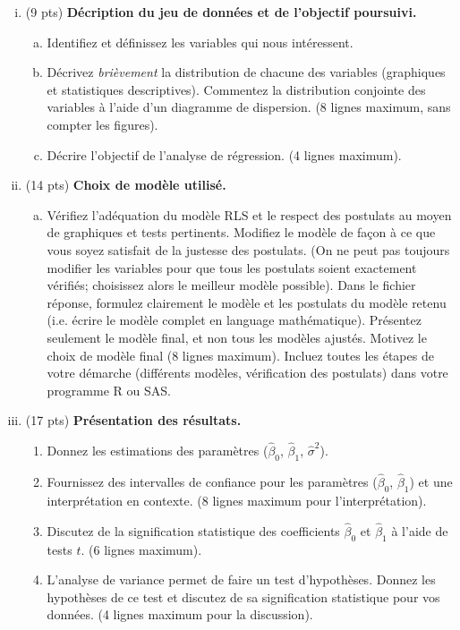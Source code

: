 \documentclass[letter, 11pt]{article}
\begin{document}
\begin{enumerate}[(i)]
	\item (9 pts) {\bf Décription du jeu de données et de l'objectif poursuivi.}
\begin{enumerate}[a)]
\item Identifiez et définissez les variables qui nous intéressent.
\item Décrivez {\it brièvement} la distribution de chacune des variables (graphiques et statistiques descriptives). Commentez la distribution conjointe des variables à l'aide d'un diagramme de dispersion.  (8 lignes maximum, sans compter les figures).
\item Décrire l'objectif de l'analyse de régression. (4 lignes maximum).
\end{enumerate}
	\item (14 pts) {\bf Choix de modèle utilisé.}
\begin{enumerate}[a)]
	\item Vérifiez l'adéquation du mod\`ele RLS et le respect des postulats au moyen de graphiques et tests pertinents. Modifiez le modèle de façon à ce que vous soyez satisfait de la justesse des postulats. (On ne peut pas toujours modifier les variables pour que tous les postulats soient exactement vérifiés;  choisissez alors le meilleur modèle possible). Dans le fichier réponse, formulez clairement le modèle et les postulats du mod\`ele retenu (i.e. écrire le modèle complet en language mathématique). Présentez seulement le modèle final, et non tous les modèles ajustés. Motivez le choix de modèle final (8 lignes maximum). Incluez toutes les étapes de votre démarche (différents modèles, vérification des postulats) dans votre programme R ou SAS. 
\end{enumerate}
	\item (17 pts) {\bf Présentation des résultats.}
\begin{enumerate}
	\item Donnez les estimations des param\`etres (${\hat \beta}_0$, ${\hat \beta}_1$, ${\hat \sigma}^2$).
	\item Fournissez des intervalles de confiance pour les paramètres (${\hat \beta}_0$, ${\hat \beta}_1$) et une interprétation en contexte. (8 lignes maximum pour l'interprétation).
	\item Discutez de la signification statistique des coefficients ${\hat \beta}_0$ et ${\hat \beta}_1$ à l'aide de tests $t$. (6 lignes maximum).
	\item L'analyse de variance permet de faire un test d'hypothèses. Donnez les hypothèses de ce test et discutez de sa signification statistique pour vos données. (4 lignes maximum pour la discussion).
\end{enumerate}
\end{enumerate}
\end{document}
